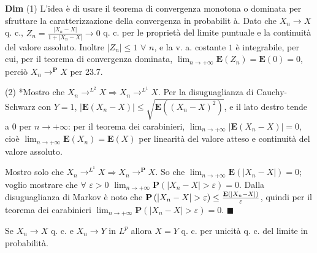 \documentclass{article}
\begin{document}
\textbf{Dim} (1) L'idea \`{e} di usare il teorema di convergenza monotona o
dominata per sfruttare la caratterizzazione della convergenza in probabilit%
\`{a}. Dato che $X_{n}\rightarrow X$ q. c., $Z_{n}=\frac{\left\vert
X_{n}-X\right\vert }{1+\left\vert X_{n}-X\right\vert }\rightarrow 0$ q. c.
per le propriet\`{a} del limite puntuale e la continuit\`{a} del valore
assoluto. Inoltre $\left\vert Z_{n}\right\vert \leq 1$ $\forall $ $n$, e la
v. a. costante $1$ \`{e} integrabile, per cui, per il teorema di convergenza
dominata, $\lim_{n\rightarrow +\infty }\mathbf{E}\left( Z_{n}\right) =%
\mathbf{E}\left( 0\right) =0$, perci\`{o} $X_{n}\rightarrow ^{\mathbf{P}}X$
per 23.7.

(2) *Mostro che $X_{n}\rightarrow ^{L^{2}}X\Longrightarrow X_{n}\rightarrow
^{L^{1}}X$. Per la disuguaglianza di Cauchy-Schwarz con $Y=1$, $\left\vert 
\mathbf{E}\left( X_{n}-X\right) \right\vert \leq \sqrt{\mathbf{E}\left(
\left( X_{n}-X\right) ^{2}\right) }$, e il lato destro tende a $0$ per $%
n\rightarrow +\infty $: per il teorema dei carabinieri, $\lim_{n\rightarrow
+\infty }\left\vert \mathbf{E}\left( X_{n}-X\right) \right\vert =0$, cio\`{e}
$\lim_{n\rightarrow +\infty }\mathbf{E}\left( X_{n}\right) =\mathbf{E}\left(
X\right) $ per linearit\`{a} del valore atteso e continuit\`{a} del valore
assoluto.

Mostro solo che $X_{n}\rightarrow ^{L^{1}}X\Longrightarrow X_{n}\rightarrow
^{\mathbf{P}}X$. So che $\lim_{n\rightarrow +\infty }\mathbf{E}\left(
\left\vert X_{n}-X\right\vert \right) =0$; voglio mostrare che $\forall $ $%
\varepsilon >0$ $\lim_{n\rightarrow +\infty }\mathbf{P}\left( \left\vert
X_{n}-X\right\vert >\varepsilon \right) =0$. Dalla disuguaglianza di Markov 
\`{e} noto che $\mathbf{P}\left( \left\vert X_{n}-X\right\vert >\varepsilon
\right) \leq \frac{\mathbf{E}\left( \left\vert X_{n}-X\right\vert \right) }{%
\varepsilon }$, quindi per il teorema dei carabinieri $\lim_{n\rightarrow
+\infty }\mathbf{P}\left( \left\vert X_{n}-X\right\vert >\varepsilon \right)
=0$. $\blacksquare $

Se $X_{n}\rightarrow X$ q. c. e $X_{n}\rightarrow Y$ in $L^{p}$ allora $X=Y$
q. c. per unicit\`{a} q. c. del limite in probabilit\`{a}.
\end{document}
